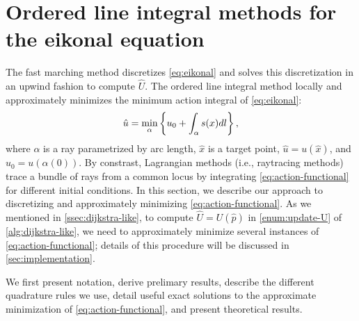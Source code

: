 \documentclass[sisc-eikonal.tex]{subfiles}
\begin{document}
\section{Ordered line integral methods for the eikonal equation}

The fast marching method discretizes \cref{eq:eikonal} and solves this
discretization in an upwind fashion to compute $\hat{U}$. The ordered
line integral method locally and approximately minimizes the minimum
action integral of \cref{eq:eikonal}:
\begin{equation}
  \label{eq:action-functional}
  \hat{u} = \min_{\alpha} \set{u_0 + \int_\alpha s(x) dl},
\end{equation}
where $\alpha$ is a ray parametrized by arc length, $\hat{x}$ is a
target point, $\hat{u} = u(\hat{x})$, and $u_0 = u(\alpha(0))$. By
constrast, Lagrangian methods (i.e., raytracing methods) trace a
bundle of rays from a common locus by integrating
\cref{eq:action-functional} for different initial conditions. In this
section, we describe our approach to discretizing and approximately
minimizing \cref{eq:action-functional}. As we mentioned in
\cref{ssec:dijkstra-like}, to compute $\hat{U} = U(\hat{p})$ in
\cref{enum:update-U} of \cref{alg:dijkstra-like}, we need to
approximately minimize several instances of
\cref{eq:action-functional}; details of this procedure will be
discussed in \cref{sec:implementation}.

We first present notation, derive prelimary results, describe the
different quadrature rules we use, detail useful exact solutions to
the approximate minimization of \cref{eq:action-functional}, and
present theoretical results.
\end{document}
